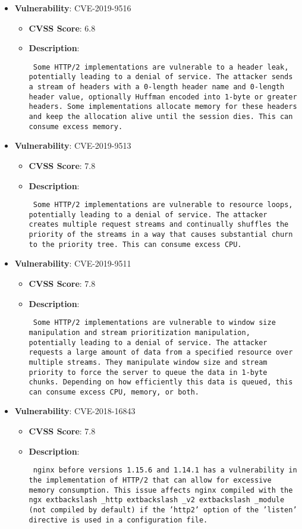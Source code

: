 \documentclass{article}
\begin{document}
\begin{itemize}
        \item \textbf{Vulnerability}: CVE-2019-9516
        \begin{itemize}
            \item \textbf{CVSS Score}:  6.8 
            \item \textbf{Description}: \parbox{\linewidth}{\texttt{ Some HTTP/2 implementations are vulnerable to a header leak, potentially leading to a denial of service. The attacker sends a stream of headers with a 0-length header name and 0-length header value, optionally Huffman encoded into 1-byte or greater headers. Some implementations allocate memory for these headers and keep the allocation alive until the session dies. This can consume excess memory. }}
        \end{itemize}
    
        \item \textbf{Vulnerability}: CVE-2019-9513
        \begin{itemize}
            \item \textbf{CVSS Score}:  7.8 
            \item \textbf{Description}: \parbox{\linewidth}{\texttt{ Some HTTP/2 implementations are vulnerable to resource loops, potentially leading to a denial of service. The attacker creates multiple request streams and continually shuffles the priority of the streams in a way that causes substantial churn to the priority tree. This can consume excess CPU. }}
        \end{itemize}
    
        \item \textbf{Vulnerability}: CVE-2019-9511
        \begin{itemize}
            \item \textbf{CVSS Score}:  7.8 
            \item \textbf{Description}: \parbox{\linewidth}{\texttt{ Some HTTP/2 implementations are vulnerable to window size manipulation and stream prioritization manipulation, potentially leading to a denial of service. The attacker requests a large amount of data from a specified resource over multiple streams. They manipulate window size and stream priority to force the server to queue the data in 1-byte chunks. Depending on how efficiently this data is queued, this can consume excess CPU, memory, or both. }}
        \end{itemize}
    
        \item \textbf{Vulnerability}: CVE-2018-16843
        \begin{itemize}
            \item \textbf{CVSS Score}:  7.8 
            \item \textbf{Description}: \parbox{\linewidth}{\texttt{ nginx before versions 1.15.6 and 1.14.1 has a vulnerability in the implementation of HTTP/2 that can allow for excessive memory consumption. This issue affects nginx compiled with the ngx	extbackslash _http	extbackslash _v2	extbackslash _module (not compiled by default) if the 'http2' option of the 'listen' directive is used in a configuration file. }}
        \end{itemize}
    

\end{itemize}
\end{document}
